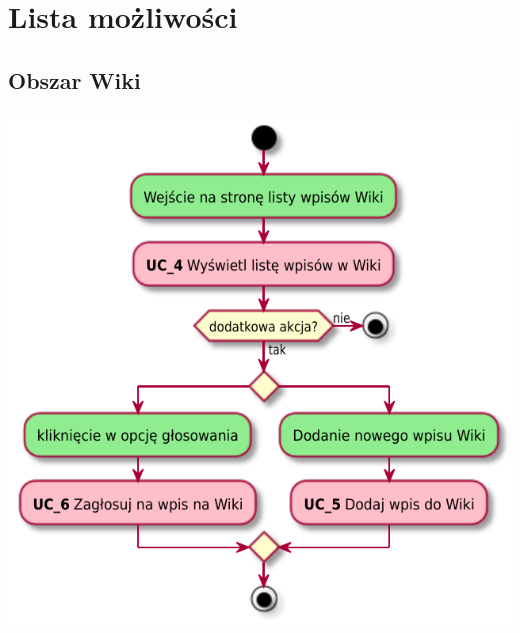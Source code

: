 \documentclass[oneside]{scrreprt}
\begin{document}
\section{Lista możliwości}
\subsection{Obszar Wiki}
\includegraphics[width=\textwidth, keepaspectratio]{graphics/activity_diagram_wiki.pdf}
\end{document}
